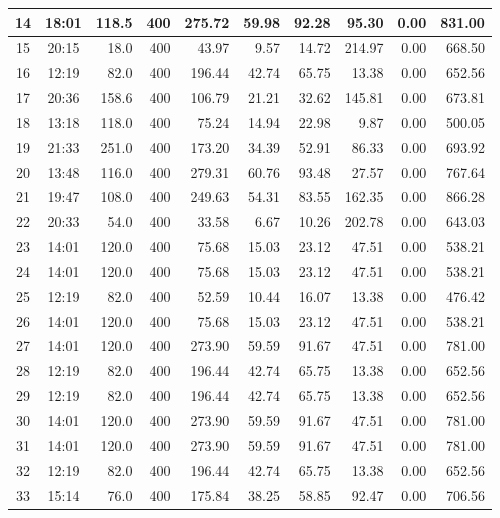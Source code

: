 \begin{landscape}
\begin{longtable}{|c|c|r|r|r|r|r|r|r|r|}
\hline
14 & 18:01 & 118.5 & 400 & 275.72 & 59.98 & 92.28 & 95.30 & 0.00 & 831.00 \\
\hline
\rowcolor{gray!8}
15 & 20:15 & 18.0 & 400 & 43.97 & 9.57 & 14.72 & 214.97 & 0.00 & 668.50 \\
\hline
16 & 12:19 & 82.0 & 400 & 196.44 & 42.74 & 65.75 & 13.38 & 0.00 & 652.56 \\
\hline
\rowcolor{gray!8}
17 & 20:36 & 158.6 & 400 & 106.79 & 21.21 & 32.62 & 145.81 & 0.00 & 673.81 \\
\hline
18 & 13:18 & 118.0 & 400 & 75.24 & 14.94 & 22.98 & 9.87 & 0.00 & 500.05 \\
\hline
\rowcolor{gray!8}
19 & 21:33 & 251.0 & 400 & 173.20 & 34.39 & 52.91 & 86.33 & 0.00 & 693.92 \\
\hline
20 & 13:48 & 116.0 & 400 & 279.31 & 60.76 & 93.48 & 27.57 & 0.00 & 767.64 \\
\hline
\rowcolor{gray!8}
21 & 19:47 & 108.0 & 400 & 249.63 & 54.31 & 83.55 & 162.35 & 0.00 & 866.28 \\
\hline
22 & 20:33 & 54.0 & 400 & 33.58 & 6.67 & 10.26 & 202.78 & 0.00 & 643.03 \\
\hline
\rowcolor{gray!8}
23 & 14:01 & 120.0 & 400 & 75.68 & 15.03 & 23.12 & 47.51 & 0.00 & 538.21 \\
\hline
24 & 14:01 & 120.0 & 400 & 75.68 & 15.03 & 23.12 & 47.51 & 0.00 & 538.21 \\
\hline
\rowcolor{gray!8}
25 & 12:19 & 82.0 & 400 & 52.59 & 10.44 & 16.07 & 13.38 & 0.00 & 476.42 \\
\hline
26 & 14:01 & 120.0 & 400 & 75.68 & 15.03 & 23.12 & 47.51 & 0.00 & 538.21 \\
\hline
\rowcolor{gray!8}
27 & 14:01 & 120.0 & 400 & 273.90 & 59.59 & 91.67 & 47.51 & 0.00 & 781.00 \\
\hline
28 & 12:19 & 82.0 & 400 & 196.44 & 42.74 & 65.75 & 13.38 & 0.00 & 652.56 \\
\hline
\rowcolor{gray!8}
29 & 12:19 & 82.0 & 400 & 196.44 & 42.74 & 65.75 & 13.38 & 0.00 & 652.56 \\
\hline
30 & 14:01 & 120.0 & 400 & 273.90 & 59.59 & 91.67 & 47.51 & 0.00 & 781.00 \\
\hline
\rowcolor{gray!8}
31 & 14:01 & 120.0 & 400 & 273.90 & 59.59 & 91.67 & 47.51 & 0.00 & 781.00 \\
\hline
32 & 12:19 & 82.0 & 400 & 196.44 & 42.74 & 65.75 & 13.38 & 0.00 & 652.56 \\
\hline
\rowcolor{gray!8}
33 & 15:14 & 76.0 & 400 & 175.84 & 38.25 & 58.85 & 92.47 & 0.00 & 706.56 \\

\end{longtable}
\end{landscape}
